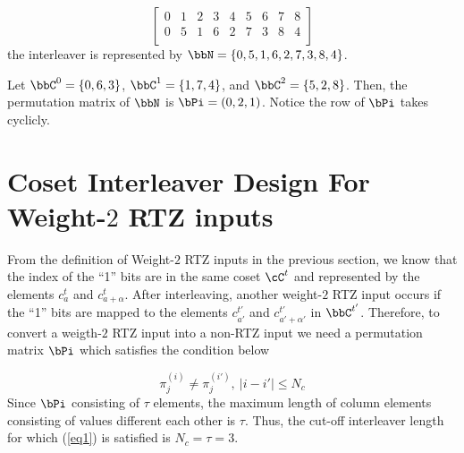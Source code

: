 \documentclass[11pt, oneside, dvipdfmx]{book}
\begin{document}
$$  
 \begin{bmatrix}
0 & 1 & 2 & 3 & 4 & 5 & 6 & 7 & 8 \\
0 & 5 & 1 & 6 & 2 & 7 & 3 & 8 & 4 \\
\end{bmatrix}
$$
the interleaver is represented by $\bbN=\{0,5,1,6,2,7,3,8,4\}$.

Let $\bbC^0=\{0,6,3\}$, $\bbC^1=\{1,7,4\}$, and $\bbC^2=\{5,2,8\}$. Then, the permutation matrix of $\bbN$ is
$\bPi = (0,2,1)$. Notice the row of $\bPi$ takes cyclicly.


\section{Coset Interleaver Design For Weight-$2$ RTZ inputs}
From the definition of Weight-$2$ RTZ inputs in the previous section, we know that the index of the ``1'' bits are in the same coset $\cC^t$ and represented by the elements $c_a^t$ and $c_{a+\alpha}^t$. After interleaving, another weight-$2$ RTZ input occurs if the ``1'' bits are mapped to the elements $c_{a'}^{t'}$ and $c_{a'+\alpha'}^{t'}$
 in $\bbC^{t'}$.
Therefore, to convert a weigth-$2$ RTZ input into a non-RTZ input we need a permutation matrix $\bPi$ which satisfies the condition below 

\begin{equation}
\pi_{j}^{(i)} \neq \pi_{j}^{(i')},~|i-i'| \leq N_c
\label{eq1}
\end{equation}
Since $\bPi$ consisting of $\tau$ elements, the maximum length of column elements consisting of values different each other is $\tau$. Thus, the cut-off interleaver length for which (\ref{eq1}) is satisfied is $N_c=\tau=3$.




\end{document}

